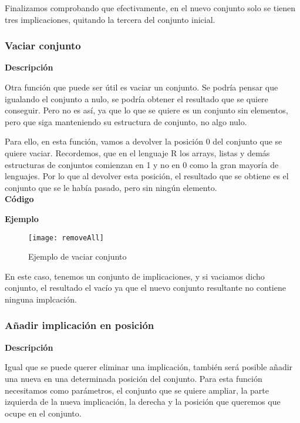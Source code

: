     Finalizamos comprobando que efectivamente, en el nuevo conjunto solo se tienen tres implicaciones, quitando la tercera del conjunto 
    inicial.



\subsubsection{Vaciar conjunto}

    \textbf{Descripci\'on}

    Otra funci\'on que puede ser \'util es vaciar un conjunto. Se podr\'ia pensar que igualando el conjunto a nulo, 
    se podr\'ia obtener el resultado que se quiere conseguir. Pero no es as\'i, ya que lo que se quiere es un conjunto sin 
    elementos, pero que siga manteniendo su estructura de conjunto, no algo nulo. 
    
    Para ello, en esta funci\'on, vamos a devolver la posici\'on 0 del conjunto que se quiere vaciar. Recordemos, que en el 
    lenguaje R los arrays, listas y dem\'as estructuras de conjuntos comienzan en 1 y no en 0 como la gran mayor\'ia de lenguajes.
    Por lo que al devolver esta posici\'on, el resultado que se obtiene es el conjunto que se le hab\'ia pasado, pero sin ning\'un 
    elemento.
    \\


    \textbf{C\'odigo}

    

    \textbf{Ejemplo}

    \begin{figure}[H]
        \centering
        \texttt{[image: removeAll]}
        \caption{Ejemplo de vaciar conjunto}
        \label{fig:removeAll}
    \end{figure}

    En este caso, tenemos un conjunto de implicaciones, y si vaciamos dicho conjunto, el resultado el vac\'io ya que el nuevo 
    conjunto resultante no contiene ninguna implcaci\'on.




\subsubsection{A\~nadir implicaci\'on en posici\'on}

    \textbf{Descripci\'on}

    Igual que se puede querer eliminar una implicaci\'on, tambi\'en ser\'a posible a\~nadir una nueva en una determinada posici\'on 
    del conjunto. Para esta funci\'on necesitamos como par\'ametros, el conjunto que se quiere ampliar, la parte izquierda de la nueva 
    implicaci\'on, la derecha y la posici\'on que queremos que ocupe en el conjunto.

